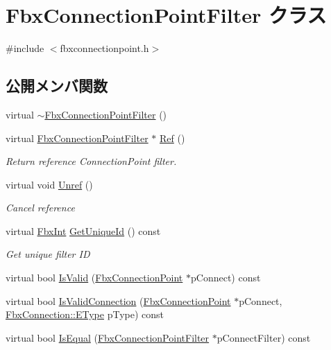 \hypertarget{class_fbx_connection_point_filter}{}\section{Fbx\+Connection\+Point\+Filter クラス}
\label{class_fbx_connection_point_filter}


{\ttfamily \#include $<$fbxconnectionpoint.\+h$>$}

\subsection*{公開メンバ関数}
\begin{DoxyCompactItemize}
\item 
virtual \hyperlink{class_fbx_connection_point_filter_a41cc6b0a440c4cdbf10db61639e7ed15}{$\sim$\+Fbx\+Connection\+Point\+Filter} ()
\item 
virtual \hyperlink{class_fbx_connection_point_filter}{Fbx\+Connection\+Point\+Filter} $\ast$ \hyperlink{class_fbx_connection_point_filter_a45f2c3742d96bcac9a03b4971242fa79}{Ref} ()
\begin{DoxyCompactList}\small\item\em Return reference Connection\+Point filter. \end{DoxyCompactList}\item 
virtual void \hyperlink{class_fbx_connection_point_filter_ab56025ba81b8ffa45d6a312fad9dcf20}{Unref} ()
\begin{DoxyCompactList}\small\item\em Cancel reference \end{DoxyCompactList}\item 
virtual \hyperlink{fbxtypes_8h_a088fa96de3b0b3ea69f0f6afef525dfb}{Fbx\+Int} \hyperlink{class_fbx_connection_point_filter_a07a0b5af84fa20ddbd2fd019b850832f}{Get\+Unique\+Id} () const
\begin{DoxyCompactList}\small\item\em Get unique filter ID \end{DoxyCompactList}\item 
virtual bool \hyperlink{class_fbx_connection_point_filter_abed99893efb038558371fd8a70c815b4}{Is\+Valid} (\hyperlink{class_fbx_connection_point}{Fbx\+Connection\+Point} $\ast$p\+Connect) const
\item 
virtual bool \hyperlink{class_fbx_connection_point_filter_a5107fd1fd412e96043f294a78bd3cf84}{Is\+Valid\+Connection} (\hyperlink{class_fbx_connection_point}{Fbx\+Connection\+Point} $\ast$p\+Connect, \hyperlink{class_fbx_connection_a3df448a5db356652ab99fd2be2553749}{Fbx\+Connection\+::\+E\+Type} p\+Type) const
\item 
virtual bool \hyperlink{class_fbx_connection_point_filter_a20ccb6e7d73551ecec421860e6e775e0}{Is\+Equal} (\hyperlink{class_fbx_connection_point_filter}{Fbx\+Connection\+Point\+Filter} $\ast$p\+Connect\+Filter) const
\end{DoxyCompactItemize}


